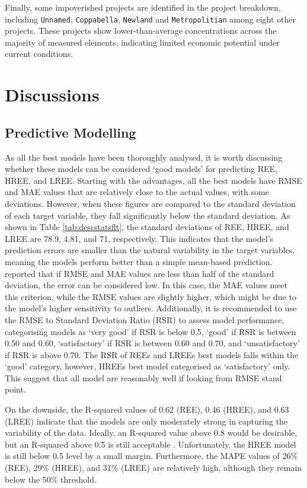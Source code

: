 \documentclass[11pt,a4paper,]{article}
\begin{document}
Finally, some impoverished projects are identified in the project breakdown, including \texttt{Unnamed}, \texttt{Coppabella}, \texttt{Newland} and \texttt{Metropolitian} among eight other projects. These projects show lower-than-average concentrations across the majority of measured elements, indicating limited economic potential under current conditions.

\section{Discussions}\label{discussions}

\subsection{Predictive Modelling}\label{predictive-modelling-3}

As all the best models have been thoroughly analysed, it is worth discussing whether these models can be considered `good models' for predicting REE, HREE, and LREE. Starting with the advantages, all the best models have RMSE and MAE values that are relatively close to the actual values, with some deviations. However, when these figures are compared to the standard deviation of each target variable, they fall significantly below the standard deviation. As shown in Table \ref{tab:descstatsflt}, the standard deviations of REE, HREE, and LREE are 78.9, 4.81, and 71, respectively. This indicates that the model's prediction errors are smaller than the natural variability in the target variables, meaning the models perform better than a simple mean-based prediction. \textcite{Moriasi2007} reported that if RMSE and MAE values are less than half of the standard deviation, the error can be considered low. In this case, the MAE values meet this criterion, while the RMSE values are slightly higher, which might be due to the model's higher sensitivity to outliers. Additionally, it is recommended to use the RMSE to Standard Deviation Ratio (RSR) to assess model performance, categorising models as `very good' if RSR is below 0.5, `good' if RSR is between 0.50 and 0.60, `satisfactory' if RSR is between 0.60 and 0.70, and `unsatisfactory' if RSR is above 0.70. The RSR of REEs and LREEs best models falls within the `good' category, however, HREEs best model categorised as `satisfactory' only. This suggest that all model are reasonably well if looking from RMSE stand point.

On the downside, the R-squared values of 0.62 (REE), 0.46 (HREE), and 0.63 (LREE) indicate that the models are only moderately strong in capturing the variability of the data. Ideally, an R-squared value above 0.8 would be desirable, but an R-squared above 0.5 is still acceptable \autocite{Moriasi2007}. Unfortunately, the HREE model is still below 0.5 level by a small margin. Furthermore, the MAPE values of 26\% (REE), 29\% (HREE), and 31\% (LREE) are relatively high, although they remain below the 50\% threshold.
\end{document}
